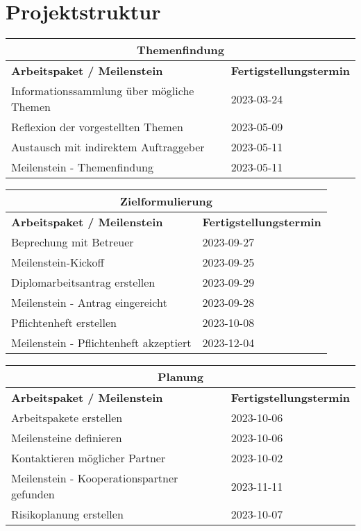 \chapter{Projektstruktur}
\begin{table}[h]
	\begin{tabular}{|p{.6\linewidth}|p{.3\linewidth}|}
		\multicolumn{2}{c}{\textbf{Themenfindung}} \\ \hline
		\textbf{Arbeitspaket / Meilenstein} & \textbf{Fertigstellungstermin} \\ \hline
		Informationssammlung über mögliche Themen & 2023-03-24 \\ \hline
		Reflexion der vorgestellten Themen & 2023-05-09 \\ \hline
		Austausch mit indirektem Auftraggeber & 2023-05-11 \\ \hline
		Meilenstein - Themenfindung & 2023-05-11 \\ \hline
	\end{tabular}
\end{table}

\begin{table}[h]
	\begin{tabular}{|p{.6\linewidth}|p{.3\linewidth}|}
		\multicolumn{2}{c}{\textbf{Zielformulierung}} \\ \hline
		\textbf{Arbeitspaket / Meilenstein} & \textbf{Fertigstellungstermin} \\ \hline
		Beprechung mit Betreuer & 2023-09-27 \\ \hline
		Meilenstein-Kickoff & 2023-09-25 \\ \hline
		Diplomarbeitsantrag erstellen & 2023-09-29 \\ \hline
		Meilenstein - Antrag eingereicht & 2023-09-28 \\ \hline
		Pflichtenheft erstellen & 2023-10-08 \\ \hline
		Meilenstein - Pflichtenheft akzeptiert & 2023-12-04 \\ \hline
	\end{tabular}
\end{table}

\begin{table}[h]
	\begin{tabular}{|p{.6\linewidth}|p{.3\linewidth}|}
		\multicolumn{2}{c}{\textbf{Planung}} \\ \hline
		\textbf{Arbeitspaket / Meilenstein} & \textbf{Fertigstellungstermin} \\ \hline
		Arbeitspakete erstellen & 2023-10-06 \\ \hline
		Meilensteine definieren & 2023-10-06 \\ \hline
		Kontaktieren möglicher Partner & 2023-10-02 \\ \hline
		Meilenstein - Kooperationspartner gefunden & 2023-11-11 \\ \hline
		Risikoplanung erstellen & 2023-10-07 \\ \hline
	\end{tabular}
\end{table}

